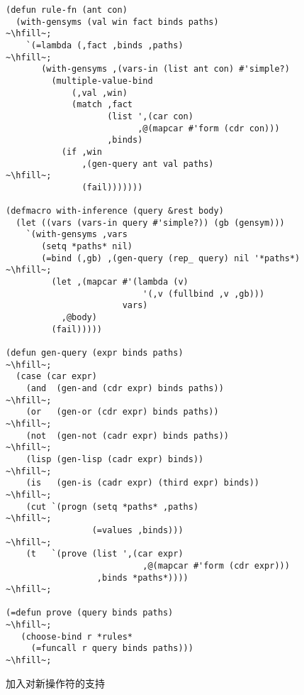 \begin{figure}
\begin{lstlisting}[escapechar=\~]
(defun rule-fn (ant con)
  (with-gensyms (val win fact binds paths)                 ~\hfill~;
    `(=lambda (,fact ,binds ,paths)                        ~\hfill~;
       (with-gensyms ,(vars-in (list ant con) #'simple?)
         (multiple-value-bind
             (,val ,win)
             (match ,fact
                    (list ',(car con)
                          ,@(mapcar #'form (cdr con)))
                    ,binds)
           (if ,win
               ,(gen-query ant val paths)                  ~\hfill~;
               (fail)))))))

(defmacro with-inference (query &rest body)
  (let ((vars (vars-in query #'simple?)) (gb (gensym)))
    `(with-gensyms ,vars
       (setq *paths* nil)
       (=bind (,gb) ,(gen-query (rep_ query) nil '*paths*) ~\hfill~;
         (let ,(mapcar #'(lambda (v)
                           '(,v (fullbind ,v ,gb)))
                       vars)
           ,@body)
         (fail)))))

(defun gen-query (expr binds paths)                        ~\hfill~;
  (case (car expr)
    (and  (gen-and (cdr expr) binds paths))                ~\hfill~;
    (or   (gen-or (cdr expr) binds paths))                 ~\hfill~;
    (not  (gen-not (cadr expr) binds paths))               ~\hfill~;
    (lisp (gen-lisp (cadr expr) binds))                    ~\hfill~;
    (is   (gen-is (cadr expr) (third expr) binds))         ~\hfill~;
    (cut `(progn (setq *paths* ,paths)                     ~\hfill~;
                 (=values ,binds)))                        ~\hfill~;
    (t   `(prove (list ',(car expr)
                           ,@(mapcar #'form (cdr expr)))
                  ,binds *paths*))))                       ~\hfill~;

(=defun prove (query binds paths)                          ~\hfill~;
   (choose-bind r *rules*
     (=funcall r query binds paths)))                      ~\hfill~;
\end{lstlisting}
  \caption{加入对新操作符的支持}
  \label{fig:adding_support_for_new_operators-1}
\end{figure}


